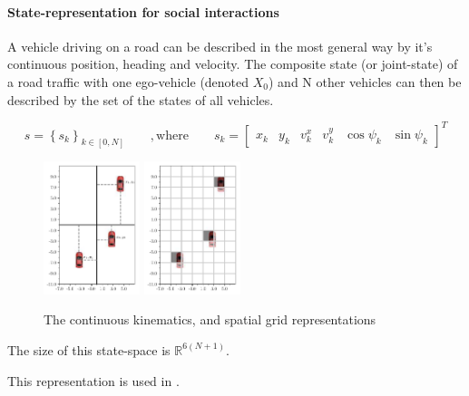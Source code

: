 \documentclass{article}
\begin{document}
\paragraph{State-representation for social interactions}{

A vehicle driving on a road can be described in the most general way by it's continuous position, heading and velocity. The composite state (or joint-state) of a road traffic with one ego-vehicle (denoted $X_0$) and N other vehicles can then be described by the set of the states of all vehicles.

\begin{equation*}
s = \left\lbrace s_k \right\rbrace_{k \in [0, N]}\qquad
,\text{where}\qquad
s_k = \begin{bmatrix}
x_k & y_k & v^x_k & v^y_k & \cos\psi_k & \sin \psi_k
\end{bmatrix}^T
\end{equation*}


\begin{figure}[tp]
	\centering
	\includegraphics[width=0.25\textwidth]{img/coordinates}
	\includegraphics[width=0.25\textwidth]{img/map}
	\caption{The continuous kinematics, and spatial grid representations}
\end{figure}

The size of this state-space is $\mathbb{R}^{6(N+1)}$.

This representation is used in \citep{Forbes1995, Wheeler2015, Bai2015, Gindele2015, Song2016, Sunberg2017, Paxton2017, Lee2017, Shalev-Shwartz2017, Galceran2017, Chen2017, Paxton2017}.


}
\end{document}
